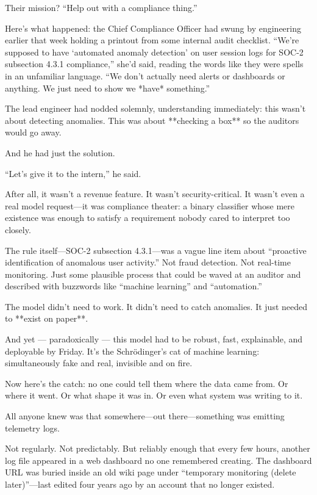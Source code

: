 \medskip

Their mission? “Help out with a compliance thing.”

Here’s what happened: the Chief Compliance Officer had swung by engineering earlier that week holding a printout from some internal audit checklist. “We’re supposed to have ‘automated anomaly detection’ on user session logs for SOC-2 subsection 4.3.1 compliance,” she’d said, reading the words like they were spells in an unfamiliar language. “We don’t actually need alerts or dashboards or anything. We just need to show we *have* something.”

The lead engineer had nodded solemnly, understanding immediately: this wasn’t about detecting anomalies. This was about **checking a box** so the auditors would go away.

And he had just the solution.

“Let’s give it to the intern,” he said.

After all, it wasn’t a revenue feature. It wasn’t security-critical. It wasn’t even a real model request—it was compliance theater: a binary classifier whose mere existence was enough to satisfy a requirement nobody cared to interpret too closely.

The rule itself—SOC-2 subsection 4.3.1—was a vague line item about “proactive identification of anomalous user activity.” Not fraud detection. Not real-time monitoring. Just some plausible process that could be waved at an auditor and described with buzzwords like “machine learning” and “automation.”

The model didn’t need to work. It didn’t need to catch anomalies. It just needed to **exist on paper**.

And yet — paradoxically — this model had to be robust, fast, explainable, and deployable by Friday. It’s the Schrödinger’s cat of machine learning: simultaneously fake and real, invisible and on fire.

Now here’s the catch: no one could tell them where the data came from. Or where it went. Or what shape it was in. Or even what system was writing to it.

All anyone knew was that somewhere—out there—something was emitting telemetry logs.

Not regularly. Not predictably. But reliably enough that every few hours, another log file appeared in a web dashboard no one remembered creating. The dashboard URL was buried inside an old wiki page under “temporary monitoring (delete later)”—last edited four years ago by an account that no longer existed.


